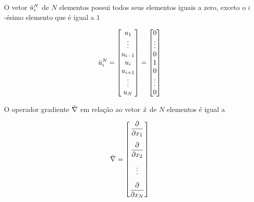 \begin{define}
    O vetor $\bar{u}_i^N$ de $N$ elementos possui todos seus elementos
    iguais a zero, exceto o $i$-ésimo elemento que é igual a $1$

    \begin{equation}
    \bar{u}_i^N =
    \begin{bmatrix}
    u_1 \\ \vdots \\ u_{i-1} \\ u_i \\ u_{i+1} \\ \vdots \\ u_N
    \end{bmatrix}=
    \begin{bmatrix}
    0 \\ \vdots \\ 0 \\ 1 \\ 0 \\ \vdots \\ 0
    \end{bmatrix}
    \label{eq:ui}
    \end{equation}
\end{define}

\begin{define}
    O operador gradiente $\bar{\nabla}$ em relação ao vetor $\bar{x}$ de $N$
    elementos é igual a

    \begin{equation}
    \vect{\nabla} =
    \begin{bmatrix}
    \dfrac{\partial}{\partial x_1} \vspace{0.3cm}\\
    \dfrac{\partial}{\partial x_2} \vspace{0.3cm}\\ \vdots \vspace{0.3cm}\\
    \dfrac{\partial}{\partial x_N}
    \end{bmatrix}
    \label{eq:opgrad}
    \end{equation}
\end{define}

